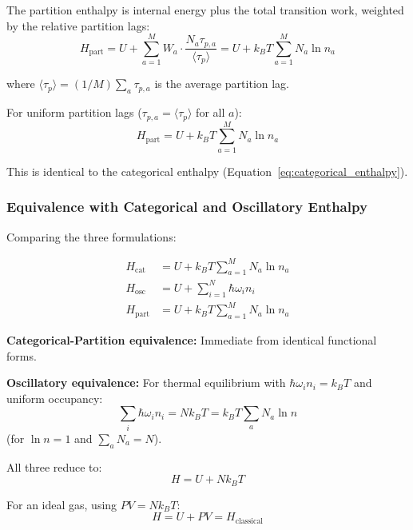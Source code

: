 The partition enthalpy is internal energy plus the total transition work, weighted by the relative partition lags:
\begin{equation}
\boxed{H_{\text{part}} = U + \sum_{a=1}^{M} W_a \cdot \frac{N_a \tau_{p,a}}{\langle\tau_p\rangle} = U + k_B T \sum_{a=1}^{M} N_a \ln n_a}
\label{eq:partition_enthalpy}
\end{equation}

where $\langle\tau_p\rangle = (1/M)\sum_a \tau_{p,a}$ is the average partition lag.

For uniform partition lags ($\tau_{p,a} = \langle\tau_p\rangle$ for all $a$):
\begin{equation}
H_{\text{part}} = U + k_B T \sum_{a=1}^{M} N_a \ln n_a
\end{equation}

This is identical to the categorical enthalpy (Equation~\ref{eq:categorical_enthalpy}).

\subsubsection{Equivalence with Categorical and Oscillatory Enthalpy}

Comparing the three formulations:

\begin{align}
H_{\text{cat}} &= U + k_B T \sum_{a=1}^{M} N_a \ln n_a \\
H_{\text{osc}} &= U + \sum_{i=1}^{N} \hbar\omega_i n_i \\
H_{\text{part}} &= U + k_B T \sum_{a=1}^{M} N_a \ln n_a
\end{align}

\textbf{Categorical-Partition equivalence:} Immediate from identical functional forms.

\textbf{Oscillatory equivalence:} For thermal equilibrium with $\hbar\omega_i n_i = k_B T$ and uniform occupancy:
\begin{equation}
\sum_i \hbar\omega_i n_i = N k_B T = k_B T \sum_a N_a \ln n
\end{equation}
(for $\ln n = 1$ and $\sum_a N_a = N$).

All three reduce to:
\begin{equation}
H = U + N k_B T
\end{equation}

For an ideal gas, using $PV = Nk_BT$:
\begin{equation}
H = U + PV = H_{\text{classical}}
\end{equation}

